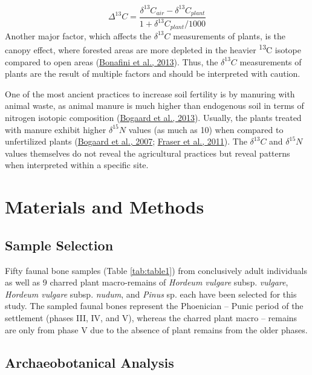 \documentclass[3p]{elsarticle} %
\begin{document}
\[\Delta^{13}C = \frac{\delta ^{13}C_{air} - \delta ^{13}C_{plant}}{1+\delta ^{13}C_{plant}/1000}\] Another major factor, which affects the \(\delta ^{13}C\) measurements of plants, is the canopy effect, where forested areas are more depleted in the heavier \textsuperscript{13}C isotope compared to open areas (\protect\hyperlink{ref-bonafini_etal13}{Bonafini et al., 2013}). Thus, the \(\delta ^{13}C\) measurements of plants are the result of multiple factors and should be interpreted with caution.

One of the most ancient practices to increase soil fertility is by manuring with animal waste, as animal manure is much higher than endogenous soil in terms of nitrogen isotopic composition (\protect\hyperlink{ref-bogaard_etal13}{Bogaard et al., 2013}). Usually, the plants treated with manure exhibit higher \(\delta ^{15}N\) values (as much as 10\text{\textperthousand}) when compared to unfertilized plants (\protect\hyperlink{ref-bogaard_etal07}{Bogaard et al., 2007}; \protect\hyperlink{ref-fraser_etal11}{Fraser et al., 2011}). The \(\delta ^{13}C\) and \(\delta ^{15}N\) values themselves do not reveal the agricultural practices but reveal patterns when interpreted within a specific site.

\hypertarget{materials-and-methods}{%
\section{Materials and Methods}\label{materials-and-methods}}

\hypertarget{sample-selection}{%
\subsection{Sample Selection}\label{sample-selection}}

Fifty faunal bone samples (Table \ref{tab:table1}) from conclusively adult individuals as well as 9 charred plant macro-remains of \emph{Hordeum vulgare} subsp. \emph{vulgare}, \emph{Hordeum vulgare} subsp. \emph{nudum}, and \emph{Pinus} sp. each have been selected for this study. The sampled faunal bones represent the Phoenician -- Punic period of the settlement (phases III, IV, and V), whereas the charred plant macro -- remains are only from phase V due to the absence of plant remains from the older phases.

\hypertarget{archaeobotanical-analysis}{%
\subsection{Archaeobotanical Analysis}\label{archaeobotanical-analysis}}
\end{document}
